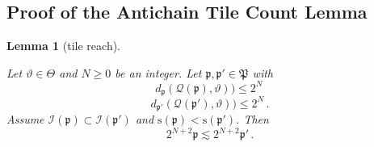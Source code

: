 \documentclass[10pt,a4paper]{article}
\theoremstyle{plain}
\newtheorem{lemma}[theorem]{Lemma}
\theoremstyle{definition}
\numberwithin{equation}{subsection}
\newcommand{\fp}{{\mathfrak p}}
\newcommand{\fP}{{\mathfrak P}}
\newcommand{\ps}{{\mathrm{s}}}
\newcommand{\scI}{{\mathcal{I}}} %
\newcommand{\mfa}{{\vartheta}}
\newcommand{\Mf}{{\Theta}}
\newcommand{\fcc}{{\mathcal{Q}}}
\newcommand{\lean}[1]{}
\newcommand{\uses}[1]{}
\newcommand{\leanok}{}
\begin{document}
\subsection{Proof of the Antichain Tile Count Lemma}
\label{subsec-geolem}


\begin{lemma}[tile reach]\label{tile-reach}
\leanok
\lean{Antichain.tile_reach}
\uses{monotone-cube-metrics}
Let $\mfa\in \Mf$ and $N\ge0$ be an integer.
Let $\fp, \fp'\in \fP$ with
\begin{equation}\label{eqassumedismfa}
    d_{\fp}(\fcc(\fp), \mfa))\le 2^N\,
\end{equation}
\begin{equation}\label{eqassumedismfap}
    d_{\fp'}(\fcc(\fp'), \mfa))\le 2^N\, .
\end{equation}
Assume $\scI(\fp)\subset \scI(\fp')$ and $\ps(\fp)<\ps(\fp')$.
Then
\begin{equation}\label{lp'lp''}2^{N+2}\fp\lesssim 2^{N+2} \fp'\, .
\end{equation}
\end{lemma}
\end{document}
